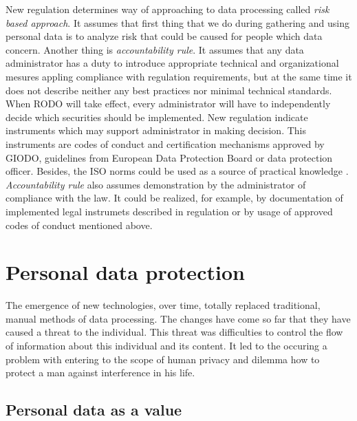 \documentclass[en, noamssymb]{mgr}
\begin{document}
\indent New regulation determines way of approaching to data processing called \textit{risk based approach}. It assumes that first thing that we do during gathering and using personal data is to analyze risk that could be caused for people which data concern. Another thing is \textit{accountability rule}. It assumes that any data administrator has a duty to introduce appropriate technical and organizational mesures appling compliance with regulation requirements, but at the same time it does not describe neither any best practices nor minimal technical standards. When RODO will take effect, every administrator will have to independently decide which securities should be implemented. New regulation indicate instruments which may support administrator in making decision. This instruments are codes of conduct and certification mechanisms approved by GIODO, guidelines from European Data Protection Board or data protection officer. Besides, the ISO norms could be used as a source of practical knowledge \cite{giodo}.\\

\indent \textit{Accountability rule} also assumes demonstration by the administrator of compliance with the law. It could be realized, for example, by documentation of implemented legal instrumets described in regulation or by usage of approved codes of conduct mentioned above.


\chapter{Personal data protection} \label{sec:sekcjaDaneOsobowe}

The emergence of new technologies, over time, totally replaced traditional, manual methods of data processing. The changes have come so far that they have caused a threat to the individual. This threat was difficulties to control the flow of information about this individual and its content. It led to the occuring a problem with entering to the scope of human privacy and dilemma how to protect a man against interference in his life.



\section{Personal data as a value}
\end{document}
